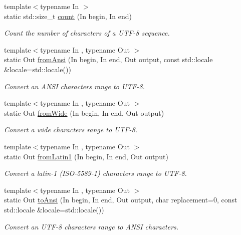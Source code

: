 \begin{DoxyCompactItemize}
{\footnotesize template$<$typename In $>$ }\\static std\-::size\-\_\-t \hyperlink{classburn_1_1_utf_3_018_01_4_a06b7865c5d0dd95e3e54361f8a28d996}{count} (In begin, In end)
\begin{DoxyCompactList}\small\item\em Count the number of characters of a U\-T\-F-\/8 sequence. \end{DoxyCompactList}\item 
{\footnotesize template$<$typename In , typename Out $>$ }\\static Out \hyperlink{classburn_1_1_utf_3_018_01_4_a50fee25a02e61be1a1067acbb41f00dc}{from\-Ansi} (In begin, In end, Out output, const std\-::locale \&locale=std\-::locale())
\begin{DoxyCompactList}\small\item\em Convert an A\-N\-S\-I characters range to U\-T\-F-\/8. \end{DoxyCompactList}\item 
{\footnotesize template$<$typename In , typename Out $>$ }\\static Out \hyperlink{classburn_1_1_utf_3_018_01_4_a6e0613f887825fe8e8879d3522567daa}{from\-Wide} (In begin, In end, Out output)
\begin{DoxyCompactList}\small\item\em Convert a wide characters range to U\-T\-F-\/8. \end{DoxyCompactList}\item 
{\footnotesize template$<$typename In , typename Out $>$ }\\static Out \hyperlink{classburn_1_1_utf_3_018_01_4_ac6b1408f09ccb90890208f1d3959696f}{from\-Latin1} (In begin, In end, Out output)
\begin{DoxyCompactList}\small\item\em Convert a latin-\/1 (I\-S\-O-\/5589-\/1) characters range to U\-T\-F-\/8. \end{DoxyCompactList}\item 
{\footnotesize template$<$typename In , typename Out $>$ }\\static Out \hyperlink{classburn_1_1_utf_3_018_01_4_ab84f1d8dc8b149783244dabf6ea86d43}{to\-Ansi} (In begin, In end, Out output, char replacement=0, const std\-::locale \&locale=std\-::locale())
\begin{DoxyCompactList}\small\item\em Convert an U\-T\-F-\/8 characters range to A\-N\-S\-I characters. \end{DoxyCompactList}\item 

\end{DoxyCompactItemize}
